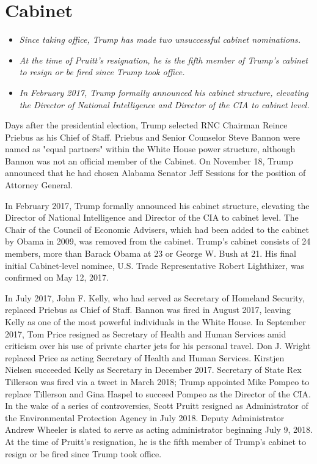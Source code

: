 \section{Cabinet}\label{cabinet}

\begin{itemize}
\item
  \emph{Since taking office, Trump has made two unsuccessful cabinet
  nominations.}
\item
  \emph{At the time of Pruitt's resignation, he is the fifth member of
  Trump's cabinet to resign or be fired since Trump took office.}
\item
  \emph{In February 2017, Trump formally announced his cabinet
  structure, elevating the Director of National Intelligence and
  Director of the CIA to cabinet level.}
\end{itemize}

Days after the presidential election, Trump selected RNC Chairman Reince
Priebus as his Chief of Staff. Priebus and Senior Counselor Steve Bannon
were named as "equal partners" within the White House power structure,
although Bannon was not an official member of the Cabinet. On November
18, Trump announced that he had chosen Alabama Senator Jeff Sessions for
the position of Attorney General.

In February 2017, Trump formally announced his cabinet structure,
elevating the Director of National Intelligence and Director of the CIA
to cabinet level. The Chair of the Council of Economic Advisers, which
had been added to the cabinet by Obama in 2009, was removed from the
cabinet. Trump's cabinet consists of 24 members, more than Barack Obama
at 23 or George W. Bush at 21. His final initial Cabinet-level nominee,
U.S. Trade Representative Robert Lighthizer, was confirmed on May 12,
2017.

In July 2017, John F. Kelly, who had served as Secretary of Homeland
Security, replaced Priebus as Chief of Staff. Bannon was fired in August
2017, leaving Kelly as one of the most powerful individuals in the White
House. In September 2017, Tom Price resigned as Secretary of Health and
Human Services amid criticism over his use of private charter jets for
his personal travel. Don J. Wright replaced Price as acting Secretary of
Health and Human Services. Kirstjen Nielsen succeeded Kelly as Secretary
in December 2017. Secretary of State Rex Tillerson was fired via a tweet
in March 2018; Trump appointed Mike Pompeo to replace Tillerson and Gina
Haspel to succeed Pompeo as the Director of the CIA. In the wake of a
series of controversies, Scott Pruitt resigned as Administrator of the
Environmental Protection Agency in July 2018. Deputy Administrator
Andrew Wheeler is slated to serve as acting administrator beginning July
9, 2018. At the time of Pruitt's resignation, he is the fifth member of
Trump's cabinet to resign or be fired since Trump took office.

